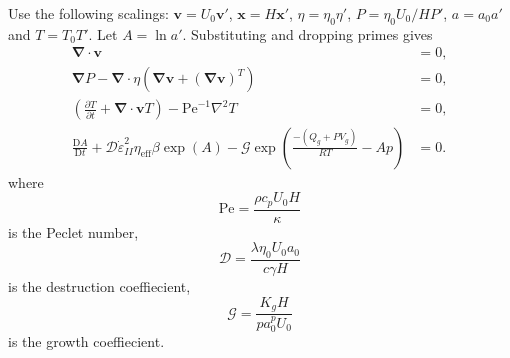 \documentclass[a4paper]{article}
\newcommand{\Div}{{\boldsymbol{\nabla}}\cdot}
\newcommand{\Grad}{{\boldsymbol{\nabla}}}
\newcommand{\delsq}{\nabla^2}
\newcommand{\ldiff}[2]{\frac{\mathrm{D}{#1}}{\mathrm{D}{#2}}}
\newcommand{\strr}{\dot{\varepsilon}}
\newcommand{\xvec}{\boldsymbol{x}}
\newcommand{\vel}{\boldsymbol{v}}
\newcommand{\Pe}{\text{Pe}}
\begin{document}
Use the following scalings: $\vel = U_0\vel'$, $\xvec = H\xvec'$,
$\eta = \eta_0\eta'$, $P=\eta_0U_0/HP'$, $a = a_0 a'$ and $T = T_0T'$. 
Let $A = \ln a'$. Substituting
and dropping primes gives
\begin{align}
  \label{eq:gov_dimensional}
  \Div\vel &= 0,\\
  \Grad P - \Div \eta(\Grad\vel + (\Grad\vel)^T) &= 0,\\
  \left( \frac{\partial T}{\partial t} + \Div \vel T \right) - \Pe^{-1}\delsq T &= 0,\\
  \ldiff{A}{t} +
  \mathcal{D}\strr_{II}^2\eta_\text{eff}\beta\exp\left(A\right) - 
  \mathcal{G}\exp\left(\frac{-(Q_g + PV_g)}{RT} - Ap \right) &= 0.
\end{align}
where 
\begin{equation}
  \label{eq:1}
  \Pe = \frac{\rho c_pU_0H}{\kappa}
\end{equation}
is the Peclet number,
\begin{equation}
  \label{eq:2}
  \mathcal{D} = \frac{\lambda\eta_0U_0a_0}{c\gamma H}
\end{equation}
is the destruction coeffiecient,
\begin{equation}
  \label{eq:3}
  \mathcal{G} = \frac{K_gH}{pa_0^pU_0}
\end{equation}
is the growth coeffiecient.

%
%
\end{document}
